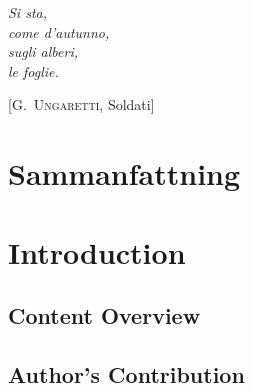 \documentclass[10pt,twoside,cucitura,classica,openany]{toptesi}
\begin{document}

\english

\cleardoublepage

\frontespizio
\paginavuota
\begin{dedica}
\end{dedica}



\indici

\begin{citazioni}
  \textit{Si sta, \\
    come d'autunno, \\
    sugli alberi, \\
    le foglie.}

  [\textsc{G.~Ungaretti}, Soldati]
\end{citazioni}


\printglossaries

\chapter*{Sammanfattning}




\sommario



\mainmatter

\chapter{Introduction}
\label{cha:intro}



\section{Content Overview}
\label{sec:content-overview}



\section{Author's Contribution}
\label{sec:authors-contribution}
\end{document}
